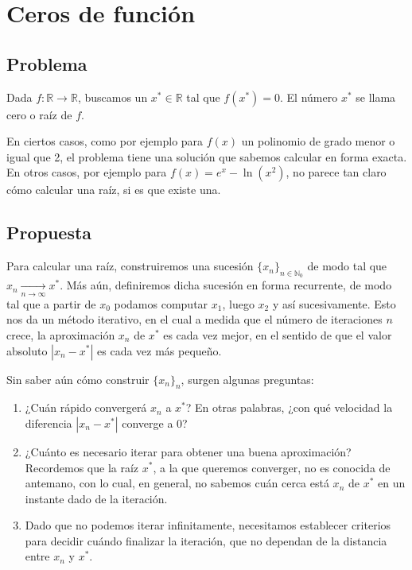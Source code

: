\section{Ceros de función}

\subsection{Problema}

Dada $f : \mathbb{R} \to \mathbb{R}$, buscamos un $x^* \in \mathbb{R}$ tal que $f(x^*) = 0$. El número $x^*$ se llama cero o raíz de $f$.

En ciertos casos, como por ejemplo para $f(x)$ un polinomio de grado menor o igual que 2, el problema tiene una solución que sabemos calcular en forma exacta. En otros casos, por ejemplo para $f(x) = e^x - \ln(x^2)$, no parece tan claro cómo calcular una raíz, si es que existe una.

\subsection{Propuesta}

Para calcular una raíz, construiremos una sucesión $\{x_n\}_{n \in \mathbb{N}_0}$ de modo tal que $x_n \xrightarrow[n \to \infty]{} x^*$. Más aún, definiremos dicha sucesión en forma recurrente, de modo tal que a partir de $x_0$ podamos computar $x_1$, luego $x_2$ y así sucesivamente. Esto nos da un método iterativo, en el cual a medida que el número de iteraciones $n$ crece, la aproximación $x_n$ de $x^*$ es cada vez mejor, en el sentido de que el valor absoluto $|x_n - x^*|$ es cada vez más pequeño.

Sin saber aún cómo construir $\{x_n\}_n$, surgen algunas preguntas:

\begin{enumerate}
	\item ¿Cuán rápido convergerá $x_n$ a $x^*$? En otras palabras, ¿con qué velocidad la diferencia $|x_n - x^*|$ converge a 0?

	\item ¿Cuánto es necesario iterar para obtener una buena aproximación? Recordemos que la raíz $x^*$, a la que queremos converger, no es conocida de antemano, con lo cual, en general, no sabemos cuán cerca está $x_n$ de $x^*$ en un instante dado de la iteración.
	
	\item Dado que no podemos iterar infinitamente, necesitamos establecer criterios para decidir cuándo finalizar la iteración, que no dependan de la distancia entre $x_n$ y $x^*$.
\end{enumerate}

